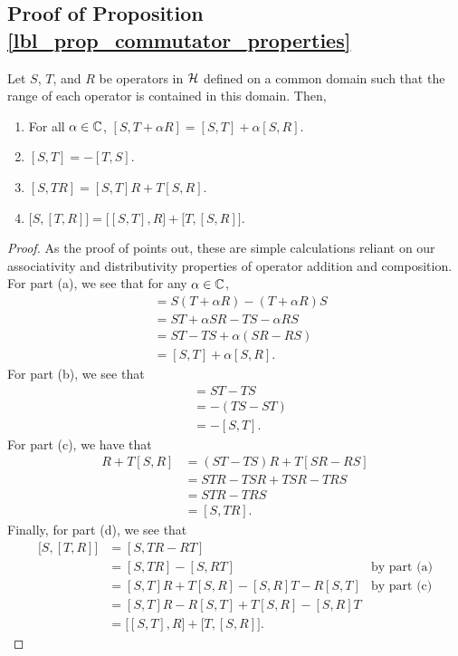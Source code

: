 \subsection{Proof of Proposition \eqref{lbl_prop_commutator_properties}}\label{proof_lbl_prop_commutator_properties}

\begin{proposition}
  Let $S$, $T$, and $R$ be operators in $\mathcal{H}$ defined on a common domain such that the range of each operator is contained in this domain. Then,
  \begin{enumerate}[label = (\alph*)]
    \item For all $\alpha \in \mathbb{C}$, $[S, T + \alpha R] = [S, T] + \alpha [S, R]$.
    \item $[S, T] = - [T, S]$.
    \item $[S, TR] = [S, T]R + T[S, R]$.
    \item $\big[ S, [T, R] \big] = \big[ [S, T], R \big] + \big[T, [S, R] \big]$.
  \end{enumerate}
\end{proposition}
\begin{proof}
  As the proof of {\cite[Proposition 3.15]{Hall2013}} points out, these are simple calculations reliant on our associativity and distributivity properties of operator addition and composition. For part (a), we see that for any $\alpha \in \mathbb{C}$,
  \begin{align*}
    [S, T + \alpha R]
    &=
    S(T + \alpha R) - (T + \alpha R)S \\
    &=
    ST + \alpha SR - TS - \alpha RS \\
    &=
    ST - TS + \alpha  (SR - RS) \\
    &=
    [S, T] + \alpha [S, R].
  \end{align*}
  For part (b), we see that
  \begin{align*}
    [S, T]
    &=
    ST - TS \\
    &=
    - (TS - ST) \\
    &=
    - [S, T].
  \end{align*}
  For part (c), we have that
  \begin{align*}
    [S, T]R + T[S, R]
    &=
    (ST - TS)R + T[SR - RS] \\
    &=
    STR - TSR + TSR - TRS \\
    &=
    STR - TRS \\
    &=
    [S, TR].
  \end{align*}
  Finally, for part (d), we see that
  \begin{align*}
    \big[S, [T, R]\big]
    &=
    [S, TR - RT] \\
    &=
    [S, TR] - [S, RT] & \text{by part (a)} \\
    &=
    [S, T]R + T[S, R] - [S, R]T - R[S, T] &\text{by part (c)} \\
    &=
    [S, T]R - R[S,T] + T[S, R] - [S, R]T \\
    &=
    \big[ [S, T], R \big] + \big[ T, [S, R]  \big].
  \end{align*}
\end{proof}
